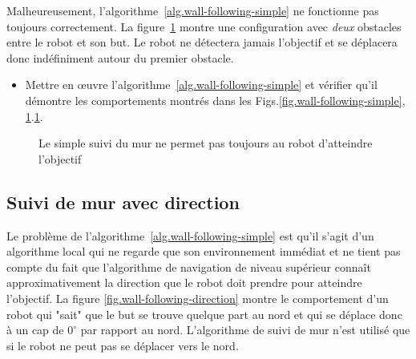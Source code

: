 Malheureusement, l'algorithme~\ref{alg.wall-following-simple} ne fonctionne pas toujours correctement. La figure~\ref{fig.wall-following-simple-bug} montre une configuration avec \emph{deux} obstacles entre le robot et son but. Le robot ne détectera jamais l'objectif et se déplacera donc indéfiniment autour du premier obstacle.

\begin{framed}
\begin{itemize}
\item Mettre en œuvre l'algorithme~\ref{alg.wall-following-simple} et vérifier qu'il démontre les comportements montrés dans les Figs.\ref{fig.wall-following-simple}, \ref{fig.wall-following-simple-bug}.\ref{fig.wall-following-simple-bug}.
\end{itemize}
\end{framed}

\begin{figure}
\begin{center}
\caption{Le simple suivi du mur ne permet pas toujours au robot d'atteindre l'objectif}\label{fig.wall-following-simple-bug}
\end{center}
\end{figure}

\subsection{Suivi de mur avec direction}

Le problème de l'algorithme~\ref{alg.wall-following-simple} est qu'il s'agit d'un algorithme local qui ne regarde que son environnement immédiat et ne tient pas compte du fait que l'algorithme de navigation de niveau supérieur connaît approximativement la direction que le robot doit prendre pour atteindre l'objectif. La figure \ref{fig.wall-following-direction} montre le comportement d'un robot qui "sait" que le but se trouve quelque part au nord et qui se déplace donc à un cap de $0^\circ$ par rapport au nord. L'algorithme de suivi de mur n'est utilisé que si le robot ne peut pas se déplacer vers le nord.

